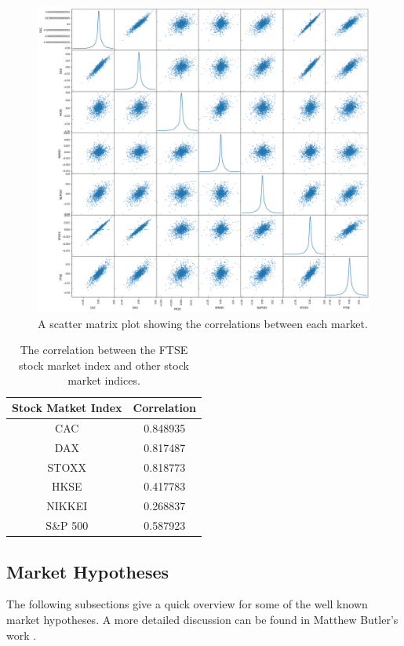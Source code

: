 \documentclass{UoYCSproject}
\begin{document}
\begin{figure}[h]
\includegraphics[width=12cm]{market_correlation}
\centering
\caption{A scatter matrix plot showing the correlations between each market.} 
\label{fig:scatterplot}
\end{figure}

\begin{table}[h]
    \centering
    \begin{tabular}{|c|c|} \hline
        \textbf{Stock Matket Index} & \textbf{Correlation} \\ \hline
        CAC &       0.848935 \\
        DAX  &     0.817487\\
        STOXX &    0.818773\\
        HKSE   &   0.417783\\
        NIKKEI  &  0.268837\\
        S\&P 500   & 0.587923\\

        \hline
    \end{tabular}
    \caption{The correlation between the FTSE stock market index and other stock market indices.}
    \label{tab:correlations}
\end{table}


\subsection{Market Hypotheses}
The following subsections give a quick overview for some of the well known market hypotheses. A more detailed discussion can be found in Matthew Butler's work \cite{butler2012computational}.
\end{document}
